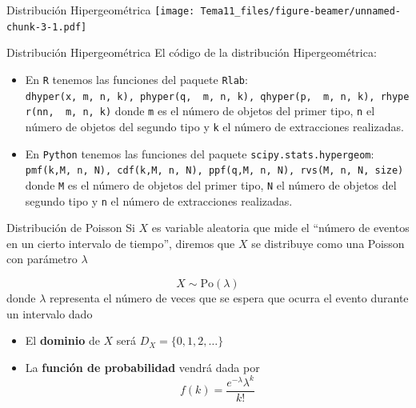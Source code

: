 \documentclass[
  ignorenonframetext,
]{beamer}
\providecommand{\tightlist}{%
  \setlength{\itemsep}{0pt}\setlength{\parskip}{0pt}}
\begin{document}
\begin{frame}{Distribución Hipergeométrica}
\protect\hypertarget{distribuciuxf3n-hipergeomuxe9trica-2}{}
\texttt{[image: Tema11\_files/figure-beamer/unnamed-chunk-3-1.pdf]}
\end{frame}

\begin{frame}[fragile]{Distribución Hipergeométrica}
\protect\hypertarget{distribuciuxf3n-hipergeomuxe9trica-3}{}
El código de la distribución Hipergeométrica:

\begin{itemize}
\tightlist
\item
  En \texttt{R} tenemos las funciones del paquete \texttt{Rlab}:
  \texttt{dhyper(x,\ m,\ n,\ k),\ phyper(q,\ \ m,\ n,\ k),\ qhyper(p,\ \ m,\ n,\ k),\ rhyper(nn,\ \ m,\ n,\ k)}
  donde \texttt{m} es el número de objetos del primer tipo, \texttt{n}
  el número de objetos del segundo tipo y \texttt{k} el número de
  extracciones realizadas.
\item
  En \texttt{Python} tenemos las funciones del paquete
  \texttt{scipy.stats.hypergeom}:
  \texttt{pmf(k,M,\ n,\ N),\ cdf(k,M,\ n,\ N),\ ppf(q,M,\ n,\ N),\ rvs(M,\ n,\ N,\ size)}
  donde \texttt{M} es el número de objetos del primer tipo, \texttt{N}
  el número de objetos del segundo tipo y \texttt{n} el número de
  extracciones realizadas.
\end{itemize}
\end{frame}

\begin{frame}{Distribución de Poisson}
\protect\hypertarget{distribuciuxf3n-de-poisson}{}
Si \(X\) es variable aleatoria que mide el ``número de eventos en un
cierto intervalo de tiempo'', diremos que \(X\) se distribuye como una
Poisson con parámetro \(\lambda\)

\[X\sim \text{Po}(\lambda)\] donde \(\lambda\) representa el número de
veces que se espera que ocurra el evento durante un intervalo dado

\begin{itemize}
\item
  El \textbf{dominio} de \(X\) será \(D_X = \{0,1,2,\dots\}\)
\item
  La \textbf{función de probabilidad} vendrá dada por
  \[f(k) = \frac{e^{-\lambda}\lambda^k}{k!}\]
\end{itemize}
\end{frame}
\end{document}
